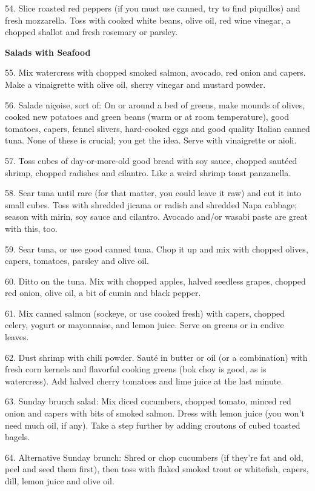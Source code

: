 \begin{recipe}
54. Slice roasted red peppers (if you must use canned, try to find
piquillos) and fresh mozzarella. Toss with cooked white beans, olive
oil, red wine vinegar, a chopped shallot and fresh rosemary or
parsley.

\textbf{Salads with Seafood}

55. Mix watercress with chopped smoked salmon, avocado, red onion and
capers. Make a vinaigrette with olive oil, sherry vinegar and mustard
powder.

56. Salade ni\c{c}oise, sort of: On or around a bed of greens, make mounds
of olives, cooked new potatoes and green beans (warm or at room
temperature), good tomatoes, capers, fennel slivers, hard-cooked eggs
and good quality Italian canned tuna. None of these is crucial; you
get the idea. Serve with vinaigrette or aioli.

57. Toss cubes of day-or-more-old good bread with soy sauce, chopped
saut\'eed shrimp, chopped radishes and cilantro. Like a weird shrimp
toast panzanella.

58. Sear tuna until rare (for that matter, you could leave it raw) and
cut it into small cubes. Toss with shredded jicama or radish and
shredded Napa cabbage; season with mirin, soy sauce and
cilantro. Avocado and/or wasabi paste are great with this, too.

59. Sear tuna, or use good canned tuna. Chop it up and mix with
chopped olives, capers, tomatoes, parsley and olive oil.

60. Ditto on the tuna. Mix with chopped apples, halved seedless
grapes, chopped red onion, olive oil, a bit of cumin and black pepper.

61. Mix canned salmon (sockeye, or use cooked fresh) with capers,
chopped celery, yogurt or mayonnaise, and lemon juice. Serve on greens
or in endive leaves.

62. Dust shrimp with chili powder. Saut\'e in butter or oil (or a
combination) with fresh corn kernels and flavorful cooking greens (bok
choy is good, as is watercress). Add halved cherry tomatoes and lime
juice at the last minute.

63. Sunday brunch salad: Mix diced cucumbers, chopped tomato, minced
red onion and capers with bits of smoked salmon. Dress with lemon
juice (you won't need much oil, if any). Take a step further by adding
croutons of cubed toasted bagels.

64. Alternative Sunday brunch: Shred or chop cucumbers (if they're fat
and old, peel and seed them first), then toss with flaked smoked trout
or whitefish, capers, dill, lemon juice and olive oil.


\end{recipe}
